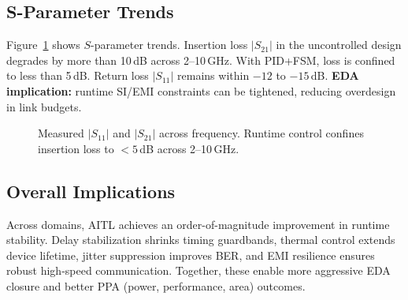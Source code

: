 \documentclass[conference]{IEEEtran}
\begin{document}
\subsection{S-Parameter Trends}
Figure~\ref{fig:sparam} shows $S$-parameter trends. Insertion loss $|S_{21}|$ in the uncontrolled design degrades by more than 10\,dB across 2--10\,GHz. With PID+FSM, loss is confined to less than 5\,dB. Return loss $|S_{11}|$ remains within $-12$ to $-15$\,dB.  
\textbf{EDA implication:} runtime SI/EMI constraints can be tightened, reducing overdesign in link budgets.

\begin{figure}[t]
\centering
{}
\caption{Measured $|S_{11}|$ and $|S_{21}|$ across frequency. Runtime control confines insertion loss to $<5$\,dB across 2--10\,GHz.}
\label{fig:sparam}
\end{figure}

\subsection{Overall Implications}
Across domains, AITL achieves an order-of-magnitude improvement in runtime stability. Delay stabilization shrinks timing guardbands, thermal control extends device lifetime, jitter suppression improves BER, and EMI resilience ensures robust high-speed communication. Together, these enable more aggressive EDA closure and better PPA (power, performance, area) outcomes.
\end{document}
